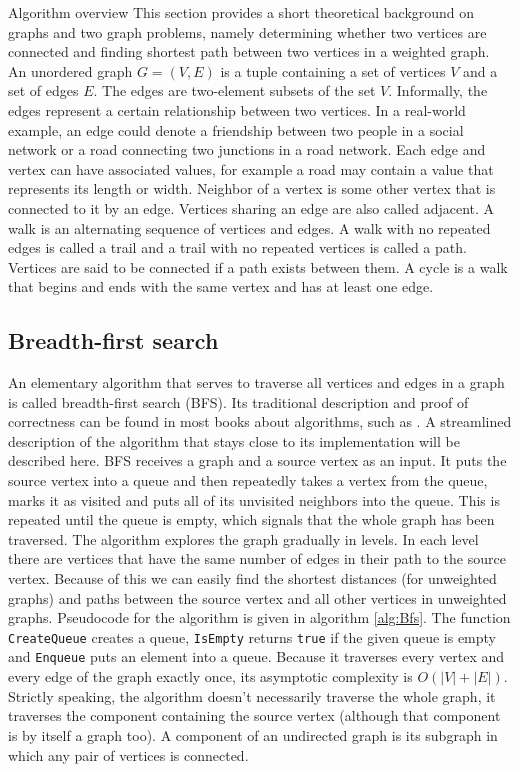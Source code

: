 \documentclass[a4paper,12pt,notitlepage,oneside]{article}
\begin{document}
\begin{section}{Algorithm overview}
\label{sec:AlgorithmOverview}
This section provides a short theoretical background on graphs and two graph problems, namely determining
whether two vertices are connected and finding shortest path between two vertices in a weighted graph.
An unordered graph \(G = (V, E)\) is a tuple containing a set of vertices $V$ and a set of edges $E$. The edges are two-element subsets of the set $V$.
Informally, the edges represent a certain relationship between two vertices. In a real-world example, an edge could denote a friendship between two people
in a social network or a road connecting two junctions in a road network. Each edge and vertex can have associated values, for example a road may contain
a value that represents its length or width. Neighbor of a vertex is some other vertex that is connected to it by an edge. Vertices sharing an edge are also
called adjacent. A walk is an alternating sequence of vertices and edges. A walk with no repeated edges is called a trail and a trail with no repeated vertices
is called a path. Vertices are said to be connected if a path exists between them. A cycle is a walk that begins and ends with the same vertex and has at least
one edge.

\subsection{Breadth-first search}
An elementary algorithm that serves to traverse all vertices and edges in a graph is called breadth-first search (BFS).
Its traditional description and proof of correctness can be found in most books about algorithms, such as \cite{IntroductionToAlgorithms}.
A streamlined description of the algorithm that stays close to its implementation will be described here. BFS receives a graph and a source vertex as an input.
It puts the source vertex into a queue and then repeatedly takes a vertex from the queue, marks it as visited and puts all of its unvisited neighbors into
the queue. This is repeated until the queue is empty, which signals that the whole graph has been traversed. The algorithm explores the graph gradually in levels.
In each level there are vertices that have the same number of edges in their path to the source vertex. Because of this we can easily find the shortest distances
(for unweighted graphs) and paths between the source vertex and all other vertices in unweighted graphs. Pseudocode for the algorithm is given in algorithm
\ref{alg:Bfs}.
The function \texttt{CreateQueue} creates a queue, \texttt{IsEmpty} returns \texttt{true} if the given queue is empty and \texttt{Enqueue} puts an element
into a queue. Because it traverses every vertex and every edge of the graph exactly once, its asymptotic complexity is \(O(|V| + |E|)\). Strictly speaking,
the algorithm doesn't necessarily traverse the whole graph, it traverses the component containing the source vertex (although that component is by itself a graph
too). A component of an undirected graph is its subgraph in which any pair of vertices is connected.


\end{section}
\end{document}
